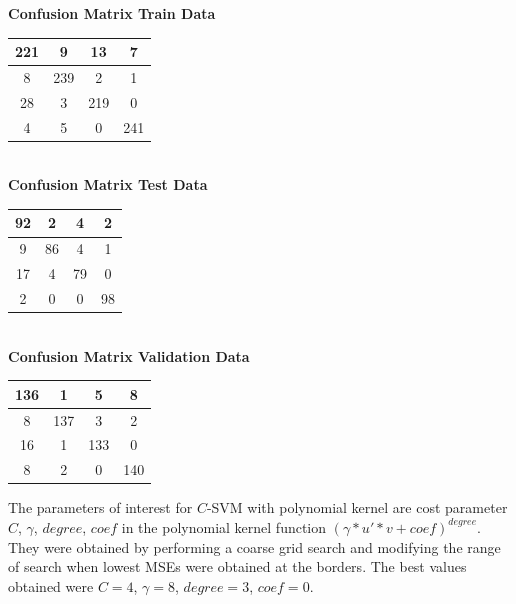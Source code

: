 \documentclass{article}
\begin{document}
\begin{flushleft}
\textbf{Confusion Matrix Train Data\\[5pt]}
\begin{tabular}{|c|c|c|c|}
\hline
221 & 9 & 13 & 7 \\
\hline
8 & 239 & 2 & 1 \\
\hline
28 & 3 & 219 & 0 \\
\hline
4 & 5 & 0 & 241 \\
\hline
\end{tabular}
\textbf{\\[10pt] Confusion Matrix Test Data \\[5pt]}
\begin{tabular}{|c|c|c|c|}
\hline
92 & 2 & 4 & 2 \\
\hline
9 & 86 & 4 & 1 \\
\hline
17 & 4 & 79 & 0 \\
\hline
2 & 0 & 0 & 98 \\
\hline
\end{tabular}
\textbf{\\[10pt] Confusion Matrix Validation Data \\[5pt]}
\begin{tabular}{|c|c|c|c|}
\hline
136 & 1 & 5 & 8 \\
\hline
8 & 137 & 3 & 2 \\
\hline
16 & 1 & 133 & 0 \\
\hline
8 & 2 & 0 & 140 \\
\hline
\end{tabular}
\end{flushleft}


The parameters of interest for $C$-SVM with polynomial kernel are cost parameter $C$, $\gamma$, $degree$, $coef$ in the polynomial kernel function $(\gamma*u'*v+coef)^{degree}$. They were obtained by performing a coarse grid search and modifying the range of search when lowest MSEs were obtained at the borders.
The best values obtained were $C=4$, $\gamma=8$, $degree=3$, $coef=0$.
\end{document}
